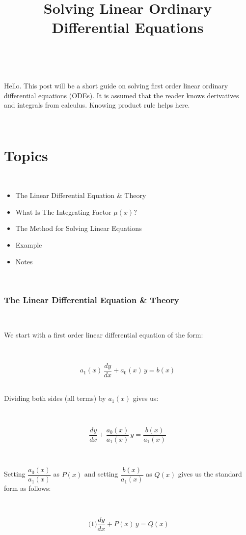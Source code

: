 \documentclass[]{article}
\title{Solving Linear Ordinary Differential Equations}
\author{}
\date{}
\providecommand{\tightlist}{%
  \setlength{\itemsep}{0pt}\setlength{\parskip}{0pt}}
\begin{document}
\maketitle

~

Hello. This post will be a short guide on solving first order linear
ordinary differential equations (ODEs). It is assumed that the reader
knows derivatives and integrals from calculus. Knowing product rule
helps here.

~

\section{Topics}\label{topics}

~

\begin{itemize}
\tightlist
\item
  The Linear Differential Equation \& Theory
\item
  What Is The Integrating Factor \(\mu(x)\)?
\item
  The Method for Solving Linear Equations
\item
  Example
\item
  Notes
\end{itemize}

~

\subsubsection{The Linear Differential Equation \&
Theory}\label{the-linear-differential-equation-theory}

~

We start with a first order linear differential equation of the form:

~

\[\displaystyle a_1(x) \, \dfrac{dy}{dx} + a_0(x) \, y = b(x)\] ~

Dividing both sides (all terms) by \(a_1(x)\) gives us:

~

\[\displaystyle \dfrac{dy}{dx} + \dfrac{a_0(x)}{a_1(x)} \, y = \dfrac{b(x)}{a_1(x)}\]

~

Setting \(\dfrac{a_0(x)}{a_1(x)}\) as \(P(x)\) and setting
\(\dfrac{b(x)}{a_1(x)}\) as \(Q(x)\) gives us the standard form as
follows:

~

\[\text{ (1)} \displaystyle \dfrac{dy}{dx} + P(x) \, y = Q(x)\]
\end{document}
